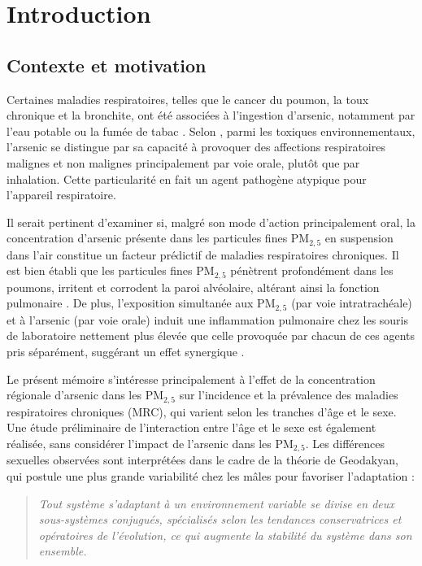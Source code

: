 \chapter{Introduction}
\label{chap:intro}

\section{Contexte et motivation}

Certaines maladies respiratoires, telles que le cancer du poumon, la toux chronique et la bronchite, ont été associées à l’ingestion d’arsenic, notamment par l’eau potable ou la fumée de tabac \citep{Parvez2009ArsenicCOPD, Smith2006, RAMSEY2023381, Sengupta14082025}. Selon \citep{RAMSEY2023381}, parmi les toxiques environnementaux, l’arsenic se distingue par sa capacité à provoquer des affections respiratoires malignes et non malignes principalement par voie orale, plutôt que par inhalation. Cette particularité en fait un agent pathogène atypique pour l’appareil respiratoire.

Il serait pertinent d’examiner si, malgré son mode d’action principalement oral, la concentration d’arsenic présente dans les particules fines PM$_{2{,}5}$ en suspension dans l’air constitue un facteur prédictif de maladies respiratoires chroniques. Il est bien établi que les particules fines PM$_{2{,}5}$ pénètrent profondément dans les poumons, irritent et corrodent la paroi alvéolaire, altérant ainsi la fonction pulmonaire \citep{Xing2016PM25}. De plus, l’exposition simultanée aux PM$_{2{,}5}$ (par voie intratrachéale) et à l’arsenic (par voie orale) induit une inflammation pulmonaire chez les souris de laboratoire nettement plus élevée que celle provoquée par chacun de ces agents pris séparément, suggérant un effet synergique \citep{RivasSantiago2024}.

Le présent mémoire s'intéresse principalement à l'effet de la concentration régionale d'arsenic dans les PM$_{2{,}5}$ sur l'incidence et la prévalence des maladies respiratoires chroniques (MRC), qui varient selon les tranches d'âge et le sexe. Une étude préliminaire de l'interaction entre l'âge et le sexe est également réalisée, sans considérer l'impact de l'arsenic dans les PM$_{2{,}5}$. Les différences sexuelles observées sont interprétées dans le cadre de la théorie de Geodakyan, qui postule une plus grande variabilité chez les mâles pour favoriser l'adaptation \citep{Geodakyan18082015} :

\begin{quote}
	\emph{Tout système s'adaptant à un environnement variable se divise en deux sous-systèmes conjugués, spécialisés selon les tendances conservatrices et opératoires de l'évolution, ce qui augmente la stabilité du système dans son ensemble.}
\end{quote}

